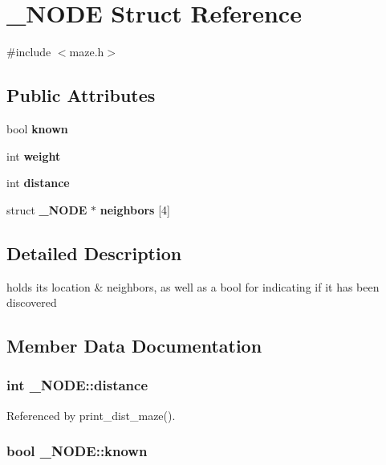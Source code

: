 \section{\-\_\-\-N\-O\-D\-E Struct Reference}
\label{struct__NODE}


{\ttfamily \#include $<$maze.\-h$>$}

\subsection*{Public Attributes}
\begin{DoxyCompactItemize}
\item 
bool {\bf known}
\item 
int {\bf weight}
\item 
int {\bf distance}
\item 
struct {\bf \-\_\-\-N\-O\-D\-E} $\ast$ {\bf neighbors} [4]
\end{DoxyCompactItemize}


\subsection{Detailed Description}
holds its location \& neighbors, as well as a bool for indicating if it has been discovered 

\subsection{Member Data Documentation}
\subsubsection[{distance}]{\setlength{\rightskip}{0pt plus 5cm}int \-\_\-\-N\-O\-D\-E\-::distance}\label{struct__NODE_a6da4411a570a71b33e7ea9afed281c39}


Referenced by print\-\_\-dist\-\_\-maze().

\subsubsection[{known}]{\setlength{\rightskip}{0pt plus 5cm}bool \-\_\-\-N\-O\-D\-E\-::known}\label{struct__NODE_a5cca231699bb41ced84dcd000bb6c117}


